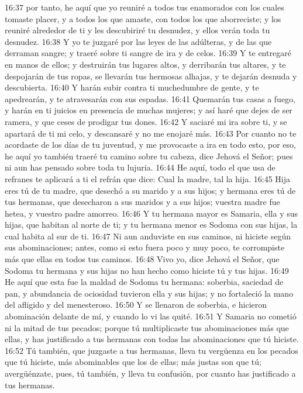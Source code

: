16:37 por tanto, he aquí que yo reuniré a todos tus enamorados con los cuales tomaste placer, y a todos los que amaste, con todos los que aborreciste; y los reuniré alrededor de ti y les descubiriré tu desnudez, y ellos verán toda tu desnudez.  
16:38 Y yo te juzgaré por las leyes de las adúlteras, y de las que derraman sangre; y traeré sobre ti sangre de ira y de celos.  
16:39 Y te entregaré en manos de ellos; y destruirán tus lugares altos, y derribarán tus altares, y te despojarán de tus ropas, se llevarán tus hermosas alhajas, y te dejarán desnuda y descubierta.  
16:40 Y harán subir contra ti muchedumbre de gente, y te apedrearán, y te atravesarán con sus espadas.  
16:41 Quemarán tus casas a fuego, y harán en ti juicios en presencia de muchas mujeres; y así haré que dejes de ser ramera, y que ceses de prodigar tus dones.  
16:42 Y saciaré mi ira sobre ti, y se apartará de ti mi celo, y descansaré y no me enojaré más.  
16:43 Por cuanto no te acordaste de los días de tu juventud, y me provocaste a ira en todo esto, por eso, he aquí yo también traeré tu camino sobre tu cabeza, dice Jehová el Señor; pues ni aun has pensado sobre toda tu lujuria.  
16:44 He aquí, todo el que usa de refranes te aplicará a ti el refrán que dice: Cual la madre, tal la hija.  
16:45 Hija eres tú de tu madre, que desechó a su marido y a sus hijos; y hermana eres tú de tus hermanas, que desecharon a sus maridos y a sus hijos; vuestra madre fue hetea, y vuestro padre amorreo.  
16:46 Y tu hermana mayor es Samaria, ella y sus hijas, que habitan al norte de ti; y tu hermana menor es Sodoma con sus hijas, la cual habita al sur de ti.  
16:47 Ni aun anduviste en sus caminos, ni hiciste según sus abominaciones; antes, como si esto fuera poco y muy poco, te corrompiste más que ellas en todos tus caminos.  
16:48 Vivo yo, dice Jehová el Señor, que Sodoma tu hermana y sus hijas no han hecho como hiciste tú y tus hijas.  
16:49 He aquí que esta fue la maldad de Sodoma tu hermana: soberbia, saciedad de pan, y abundancia de ociosidad tuvieron ella y sus hijas; y no fortaleció la mano del afligido y del menesteroso.  
16:50 Y se llenaron de soberbia, e hicieron abominación delante de mí, y cuando lo vi las quité.  
16:51 Y Samaria no cometió ni la mitad de tus pecados; porque tú multiplicaste tus abominaciones más que ellas, y has justificado a tus hermanas con todas las abominaciones que tú hiciste. 
16:52 Tú también, que juzgaste a tus hermanas, lleva tu vergüenza en los pecados que tú hiciste, más abominables que los de ellas; más justas son que tú; avergüénzate, pues, tú también, y lleva tu confusión, por cuanto has justificado a tus hermanas.  
